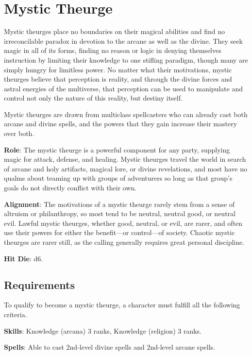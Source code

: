 \section{Mystic Theurge}

\label{f0}				
Mystic theurges place no boundaries on their magical abilities and find no irreconcilable paradox in devotion to the arcane as well as the divine. They seek magic in all of its forms, finding no reason or logic in denying themselves instruction by limiting their knowledge to one stifling paradigm, though many are simply hungry for limitless power. No matter what their motivations, mystic theurges believe that perception is reality, and through the divine forces and astral energies of the multiverse, that perception can be used to manipulate and control not only the nature of this reality, but destiny itself. 
				
Mystic theurges are drawn from multiclass spellcasters who can already cast both arcane and divine spells, and the powers that they gain increase their mastery over both.
				
\textbf{Role}: The mystic theurge is a powerful component for any party, supplying magic for attack, defense, and healing. Mystic theurges travel the world in search of arcane and holy artifacts, magical lore, or divine revelations, and most have no qualms about teaming up with groups of adventurers so long as that group's goals do not directly conflict with their own. 
				
\textbf{Alignment}: The motivations of a mystic theurge rarely stem from a sense of altruism or philanthropy, so most tend to be neutral, neutral good, or neutral evil. Lawful mystic theurges, whether good, neutral, or evil, are rarer, and often use their powers for either the benefit---or control---of society. Chaotic mystic theurges are rarer still, as the calling generally requires great personal discipline. 
				
\textbf{Hit Die}: d6.
				
\subsection{Requirements}

				
To qualify to become a mystic theurge, a character must fulfill all the following criteria.
				
\textbf{Skills}: Knowledge (arcana) 3 ranks, Knowledge (religion) 3 ranks.
				
\textbf{Spells}: Able to cast 2nd-level divine spells and 2nd-level arcane spells.
				
